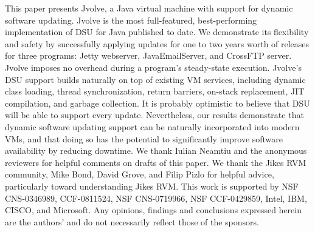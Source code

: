 \documentclass[9pt]{sigplanconf}
\newcommand{\DSU}{{\sc Jvolve}}
\begin{document}
This paper presents \DSU, a Java virtual machine with support for
dynamic software updating.  \DSU{} is the most full-featured,
best-performing implementation of DSU for Java published to date.  We
demonstrate its flexibility and safety by successfully applying updates
for one to two years worth of releases for three programs: Jetty
webserver, JavaEmailServer, and CrossFTP server.  \DSU{} imposes no
overhead during a program's steady-state  execution.  
\DSU's DSU support builds naturally
on top of existing VM services, including dynamic class loading,
thread synchronization, return barriers, on-stack replacement, JIT compilation, and
garbage collection.  It is probably optimistic to believe that DSU
will be able to support every update.  Nevertheless, our results
demonstrate that dynamic software updating support can be naturally
incorporated into modern VMs, and that doing so has the potential to
significantly improve software availability by reducing downtime.
\acks
We thank Iulian Neamtiu and the anonymous reviewers for helpful
comments on drafts of this paper.  We thank the Jikes RVM community, Mike
Bond, David Grove, and Filip Pizlo for helpful advice,
particularly toward understanding Jikes RVM\@.
This work is supported by NSF CNS-0346989, CCF-0811524, NSF CNS-0719966, NSF 
CCF-0429859, Intel, IBM, CISCO, and Microsoft. Any opinions, findings and
conclusions expressed herein are the authors' and do not necessarily
reflect those of the sponsors.


\end{document}
